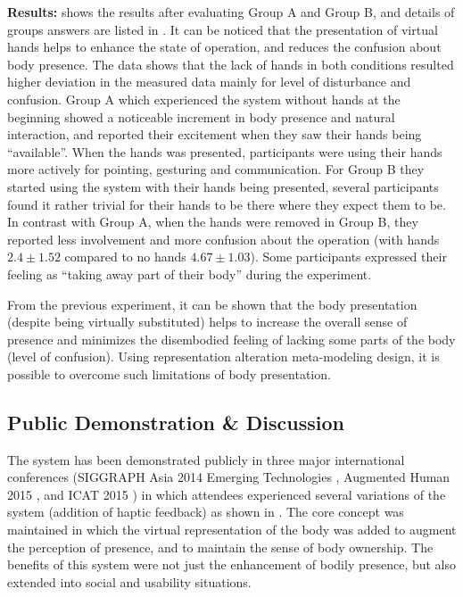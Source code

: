 \textbf{Results:}  shows the results after evaluating Group A and Group B, and details of groups answers are listed in . It can be noticed that the presentation of virtual hands helps to enhance the state of operation, and reduces the confusion about body presence. The data shows that the lack of hands in both conditions resulted higher deviation in the measured data mainly for level of disturbance and confusion. Group A which experienced the system without hands at the beginning showed a noticeable increment in body presence and natural interaction, and reported their excitement when they saw their hands being ``available''. When the hands was presented, participants were using their hands more actively for pointing, gesturing and communication. For Group B they started using the system with their hands being presented, several participants found it rather trivial for their hands to be there where they expect them to be. In contrast with Group A, when the hands were removed in Group B, they reported less involvement and more confusion about the operation (with hands $2.4\pm1.52$ compared to no hands $4.67\pm1.03$). Some participants expressed their feeling as ``taking away part of their body'' during the experiment. 


From the previous experiment, it can be shown that the body presentation (despite being virtually substituted) helps to increase the overall sense of presence and minimizes the disembodied feeling of lacking some parts of the body (level of confusion). Using representation alteration meta-modeling design, it is possible to overcome such limitations of body presentation.


\subsection{Public Demonstration \& Discussion}

The system has been demonstrated publicly in three major international conferences (SIGGRAPH Asia 2014 Emerging Technologies \cite{saraiji2014enforced}, Augmented Human 2015 \cite{saraiji2015mutual}, and ICAT 2015 \cite{saraiji2015development}) in which attendees experienced several variations of the system (addition of haptic feedback) as shown in . The core concept was maintained in which the virtual representation of the body was added to augment the perception of presence, and to maintain the sense of body ownership. The benefits of this system were not just the enhancement of bodily presence, but also extended into social and usability situations.



